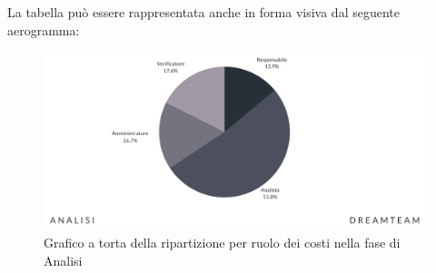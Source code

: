 La tabella può essere rappresentata anche in forma visiva dal seguente aerogramma:
\begin{figure}[H]
\centering
\includegraphics[scale=0.65]{Sezioni/SezioniPreventivo/grafici/Analisi_costi.png}
\caption{Grafico a torta della ripartizione per ruolo dei costi nella fase di Analisi}
\end{figure}




